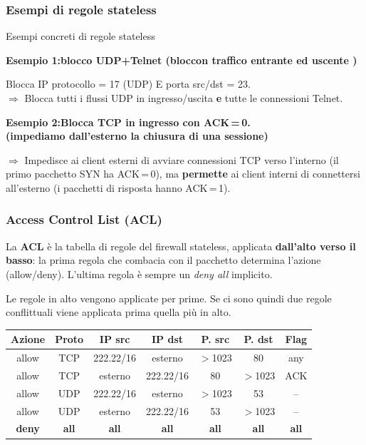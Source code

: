 \documentclass[a4paper,12pt]{report}
\renewcommand{\arraystretch}{1.2} %
\begin{document}
\newpage
\subsubsection{Esempi di regole stateless}

\begin{esempiobox}{Esempi concreti di regole stateless}
    
\textbf{Esempio 1:blocco UDP+Telnet (bloccon traffico entrante ed uscente )}

Blocca IP protocollo = 17 (UDP) E porta src/dst = 23.\\
$\Rightarrow$ Blocca tutti i flussi UDP in ingresso/uscita \textbf{e} tutte le connessioni Telnet.


\medskip
\textbf{Esempio 2:Blocca TCP in ingresso con ACK\,=\,0.\\ (impediamo dall'esterno la chiusura di una sessione)}

$\Rightarrow$ Impedisce ai client esterni di avviare connessioni TCP verso l'interno
(il primo pacchetto SYN ha ACK\,=\,0), ma \textbf{permette} ai client interni
di connettersi all'esterno (i pacchetti di risposta hanno ACK\,=\,1).
\end{esempiobox}


\subsubsection{Access Control List (ACL)}


La \textbf{ACL} \`e la tabella di regole del firewall stateless, applicata
\textbf{dall'alto verso il basso}: la prima regola che combacia con il pacchetto
determina l'azione (allow/deny). L'ultima regola \`e sempre un
\emph{deny all} implicito.

Le regole in alto vengono applicate per prime. Se ci sono quindi due regole conflittuali viene applicata prima quella più in alto.

\begin{center}
\small
\renewcommand{\arraystretch}{1.3}
\begin{tabular}{ccccccc}
\toprule
\textbf{Azione} & \textbf{Proto} & \textbf{IP src} & \textbf{IP dst} &
\textbf{P. src} & \textbf{P. dst} & \textbf{Flag} \\
\midrule
allow & TCP & 222.22/16 & esterno & $>$1023 & 80 & any \\
allow & TCP & esterno & 222.22/16 & 80 & $>$1023 & ACK \\
allow & UDP & 222.22/16 & esterno & $>$1023 & 53 & -- \\
allow & UDP & esterno & 222.22/16 & 53 & $>$1023 & -- \\
\rowcolor{red!15}\textbf{deny} & \textbf{all} & \textbf{all} &
\textbf{all} & \textbf{all} & \textbf{all} & \textbf{all} \\
\bottomrule
\end{tabular}
\end{center}
\end{document}
